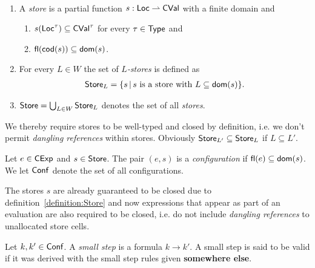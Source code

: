 \documentclass[12pt,a4paper]{report}
\newcommand{\CExp}{\sstyle{CExp}}
\newcommand{\CVal}{\sstyle{CVal}}
\newcommand{\Conf}{\sstyle{Conf}}
\begin{document}
\begin{definition}[Store] \label{definition:Store} \
  \begin{enumerate}
    \item A {\em store} is a partial function $s:\Loc \pto \CVal$ with a finite domain and
          \begin{enumerate}
            \item $s(\Loc^\tau) \subseteq \CVal^\tau$ for every $\tau\in\mathsf{Type}$ and
            \item $\mathsf{fl}(\mathsf{cod}(s)) \subseteq \mathsf{dom}(s)$.
          \end{enumerate}

    \item For every $L \in W$ the set of {\em $L$-stores} is defined as
          \[\begin{array}{l}
            \mathsf{Store}_L = \{s\,|\,\text{$s$ is a store with $L\subseteq\mathsf{dom}(s)$}\}.
          \end{array}\]

    \item $\mathsf{Store} = \bigcup_{L \in W} \mathsf{Store}_L$ denotes the set of all {\em stores}.
  \end{enumerate}
\end{definition}

We thereby require stores to be well-typed and closed by definition, i.e. we don't permit {\em dangling
references} within stores. Obviously $\mathsf{Store}_{L'} \subseteq \mathsf{Store}_L$ if $L \subseteq L'$.

\begin{definition}[Configuration]
  Let $e\in\CExp$ and $s\in\mathsf{Store}$. The pair $(e,s)$ is a {\em configuration}
  if $\mathsf{fl}(e) \subseteq \mathsf{dom}(s)$. We let $\Conf$ denote the set of all configurations.
\end{definition}

The stores $s$ are already guaranteed to be closed due to definition~\ref{definition:Store} and
now expressions that appear as part of an evaluation are also required to be closed, i.e. do not
include {\em dangling references} to unallocated store cells.


\begin{definition}
  Let $k,k'\in\Conf$. A {\em small step} is a formula
  $k \to k'$. A small step is said to be valid if it was derived with
  the small step rules given {\bf somewhere else}.
\end{definition}
\end{document}

